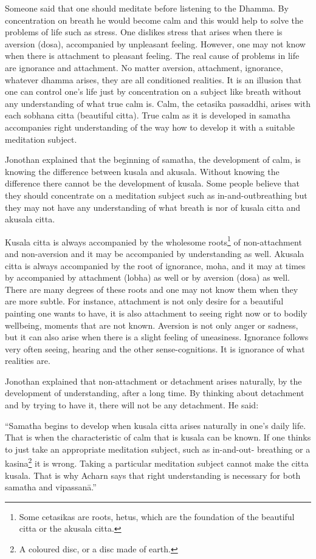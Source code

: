 Someone said that one should meditate before listening to the Dhamma. By
concentration on breath he would become calm and this would help to
solve the problems of life such as stress. One dislikes stress that
arises when there is aversion (dosa), accompanied by unpleasant feeling.
However, one may not know when there is attachment to pleasant feeling.
The real cause of problems in life are ignorance and attachment. No
matter aversion, attachment, ignorance, whatever dhamma arises, they are
all conditioned realities. It is an illusion that one can control one's
life just by concentration on a subject like breath without any
understanding of what true calm is. Calm, the cetasika passaddhi, arises
with each sobhana citta (beautiful citta). True calm as it is developed
in samatha accompanies right understanding of the way how to develop it
with a suitable meditation subject.

Jonothan explained that the beginning of samatha, the development of
calm, is knowing the difference between kusala and akusala. Without
knowing the difference there cannot be the development of kusala. Some
people believe that they should concentrate on a meditation subject such
as in-and-outbreathing but they may not have any understanding of what
breath is nor of kusala citta and akusala citta.

Kusala citta is always accompanied by the wholesome roots\footnote{Some cetasikas are
roots, hetus, which are the foundation of the beautiful citta or the
akusala citta.} of non-attachment and
non-aversion and it may be accompanied by understanding as well. Akusala
citta is always accompanied by the root of ignorance, moha, and it may
at times by accompanied by attachment (lobha) as well or by aversion
(dosa) as well. There are many degrees of these roots and one may not
know them when they are more subtle. For instance, attachment is not
only desire for a beautiful painting one wants to have, it is also
attachment to seeing right now or to bodily wellbeing, moments that are
not known. Aversion is not only anger or sadness, but it can also arise
when there is a slight feeling of uneasiness. Ignorance follows very
often seeing, hearing and the other sense-cognitions. It is ignorance of
what realities are.

Jonothan explained that non-attachment or detachment arises naturally,
by the development of understanding, after a long time. By thinking
about detachment and by trying to have it, there will not be any
detachment. He said:

``Samatha begins to develop when kusala citta arises naturally in one's
daily life. That is when the characteristic of calm that is kusala can
be known. If one thinks to just take an appropriate meditation subject,
such as in-and-out- breathing or a kasina\footnote{A coloured disc, or a
disc made of earth.} it is wrong. Taking a
particular meditation subject cannot make the citta kusala. That is why
Acharn says that right understanding is necessary for both samatha and
vipassanā.''

